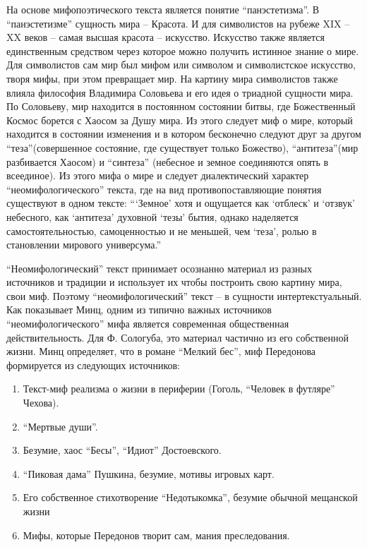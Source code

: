 \documentclass[12pt,a4paper]{article}
\begin{document}
На основе мифопоэтического текста является понятие \enquote{панэстетизма}. В \enquote{панэстетизме} сущность мира -- Красота. И для символистов на рубеже XIX -- XX веков -- самая высшая красота -- искусство. Искусство также является единственным средством через которое можно получить истинное знание о мире. Для символистов сам мир был мифом или символом и символистское искусство, творя мифы, при этом превращает мир. На картину мира символистов также влияла философия Владимира Соловьева и его идея о триадной сущности мира. По Соловьеву, мир находится в постоянном состоянии битвы, где Божественный Космос борется с Хаосом за Душу мира. Из этого следует миф о мире, который находится в состоянии изменения и в котором бесконечно следуют друг за другом \enquote{теза}(совершенное состояние, где существует только Божество), \enquote{антитеза}(мир разбивается Хаосом) и  \enquote{синтеза} (небесное и земное соединяются опять в всеединое). Из этого мифа о мире и следует диалектический характер \enquote{неомифологического} текста, где на вид противопоставляющие понятия существуют в одном тексте: \enquote{\enquote{Земное} хотя и ощущается как \enquote{отблеск} и \enquote{отзвук} небесного, как \enquote{антитеза} духовной \enquote{тезы} бытия, однако наделяется самостоятельностью, самоценностью и не меньшей, чем \enquote{теза}, ролью в становлении мирового универсума.} \parencite[71.]{mints2004}


\enquote{Неомифологический} текст принимает осознанно материал из разных источников и традиции и использует их чтобы построить свою картину мира, свои миф. Поэтому \enquote{неомифологический} текст -- в сущности интертекстуальный. Как показывает Минц, одним из типично важных источников \enquote{неомифологического} мифа является современная общественная действительность. Для Ф. Сологуба, это материал частично из его собственной жизни. Минц определяет, что в романе \enquote{Мелкий бес}, миф Передонова формируется из следующих источников:

\begin{enumerate}[itemsep=0mm, label=\asbuk*)]
\item Текст-миф реализма о жизни в периферии (Гоголь, \enquote{Человек в футляре} Чехова).
\item \enquote{Мертвые души}.
\item Безумие, хаос \enquote{Бесы}, \enquote{Идиот} Достоевского.
\item \enquote{Пиковая дама} Пушкина, безумие, мотивы игровых карт.
\item Его собственное стихотворение \enquote{Недотыкомка}, безумие обычной мещанской жизни
\item Мифы, которые Передонов творит сам, мания преследования.
\end{enumerate}
\end{document}

